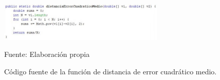 \begin{enumerate}
\begin{figure}[H]
\captionsetup{justification=centering}
\begin{center}
\includegraphics[width=0.7\textwidth]{Imagenes/Cap3/image030}
\end{center}
\begin{center}
\vskip -0.5cm
\caption{\small{Código fuente de la función de distancia de error cuadrático medio.}}
\label{fig:figura3.30}
{\small{Fuente: Elaboración propia}}
\end{center}
\end{figure}


\end{enumerate}
